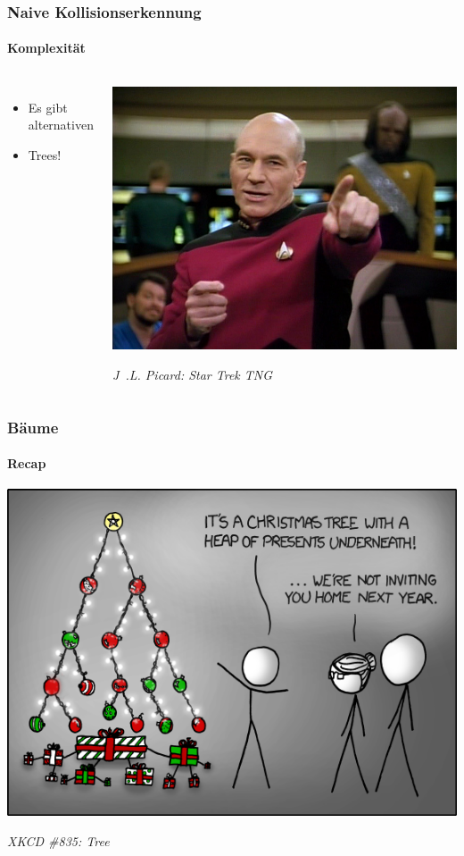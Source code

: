 \documentclass{beamer}
\begin{document}
\begin{frame}
  \frametitle{Naive Kollisionserkennung}
  \framesubtitle{Komplexität}
  \begin{columns}
      \begin{itemize}
        \item Es gibt alternativen
        \item Trees!
      \end{itemize}
      \begin{center}
        \includegraphics[scale=0.40]{rsrc/picardyeah}
        
        \tiny \it J~.L. Picard: Star Trek TNG
      \end{center}
  \end{columns}
\end{frame}

\begin{frame}
  \frametitle{Bäume}
  \framesubtitle{Recap}
  \begin{center}
    \includegraphics[scale=0.5]{rsrc/tree_xkcd835}
    
    \tiny \it XKCD \#835: Tree
  \end{center}
\end{frame}
\end{document}
